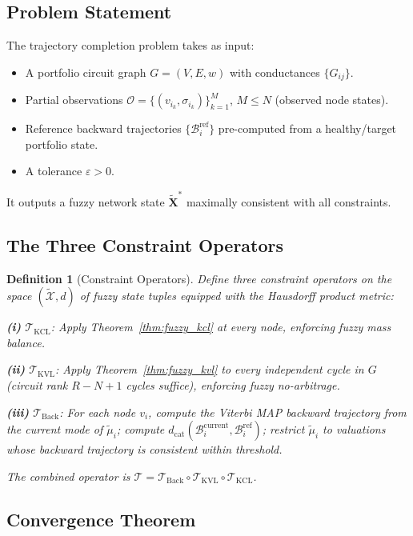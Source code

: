 \documentclass[twocolumn,10pt]{article}
\newtheorem{definition}[theorem]{Definition}
\theoremstyle{remark}
\newcommand{\fuzzy}[1]{\tilde{#1}}
\newcommand{\fuzzyset}[1]{\tilde{\mu}_{#1}}
\newcommand{\dcat}{d_{\mathrm{cat}}}
\newcommand{\Tkcl}{\mathcal{T}_{\mathrm{KCL}}}
\newcommand{\Tkvl}{\mathcal{T}_{\mathrm{KVL}}}
\newcommand{\Tback}{\mathcal{T}_{\mathrm{Back}}}
\newcommand{\Tcomp}{\mathcal{T}}
\newcommand{\thmref}[1]{Theorem~\ref{#1}}
\begin{document}
\subsection{Problem Statement}

The trajectory completion problem takes as input:
\begin{itemize}
    \item A portfolio circuit graph $G = (V, E, w)$ with conductances $\{G_{ij}\}$.
    \item Partial observations $\mathcal{O} = \{(v_{i_k}, \sigma_{i_k})\}_{k=1}^M$, $M \leq N$ (observed node states).
    \item Reference backward trajectories $\{\mathcal{B}_i^{\text{ref}}\}$ pre-computed from a healthy/target portfolio state.
    \item A tolerance $\varepsilon > 0$.
\end{itemize}

It outputs a fuzzy network state $\fuzzy{\mathbf{X}}^*$ maximally consistent with all constraints.

\subsection{The Three Constraint Operators}

\begin{definition}[Constraint Operators]
\label{def:constraint_ops}
Define three constraint operators on the space $(\tilde{\mathcal{X}}, d)$ of fuzzy state tuples equipped with the Hausdorff product metric:

\textbf{(i)} $\Tkcl$: Apply \thmref{thm:fuzzy_kcl} at every node, enforcing fuzzy mass balance.

\textbf{(ii)} $\Tkvl$: Apply \thmref{thm:fuzzy_kvl} to every independent cycle in $G$ (circuit rank $R - N + 1$ cycles suffice), enforcing fuzzy no-arbitrage.

\textbf{(iii)} $\Tback$: For each node $v_i$, compute the Viterbi MAP backward trajectory from the current mode of $\fuzzyset{i}$; compute $\dcat(\mathcal{B}_i^{\text{current}}, \mathcal{B}_i^{\text{ref}})$; restrict $\fuzzyset{i}$ to valuations whose backward trajectory is consistent within threshold.

The combined operator is $\Tcomp = \Tback \circ \Tkvl \circ \Tkcl$.
\end{definition}

\subsection{Convergence Theorem}
\label{sec:convergence}
\end{document}
